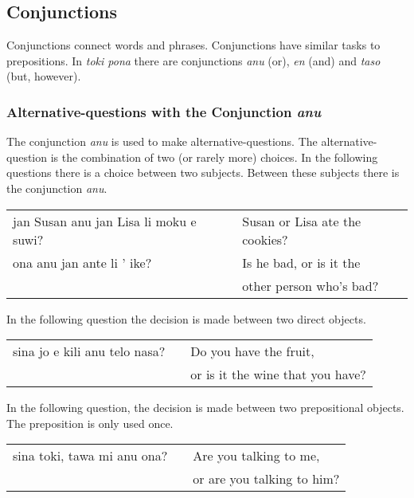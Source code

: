 \subsection*{Conjunctions}
%
%
Conjunctions connect words and phrases. 
Conjunctions have similar tasks to prepositions.
In \textit{toki pona} there are conjunctions \textit{anu} (or),  \textit{en} (and) and \textit{taso} (but, however).

%
\subsubsection*{Alternative-questions with the Conjunction \textit{anu}}
%
%
The conjunction \textit{anu} is used to make alternative-questions. 
The alternative-question is the combination of two (or rarely more) choices. 
In the following questions there is a choice between two subjects. 
Between these subjects there is the conjunction \textit{anu}. 

\begin{supertabular}{p{5,5cm}|ll}
jan Susan anu jan Lisa li moku e suwi?  && Susan or Lisa ate the cookies? \\
ona anu jan ante li ' ike? && Is he bad, or is it the \\ && other person who's bad? \\
\end{supertabular} 

In the following question the decision is made between two direct objects. 

\begin{supertabular}{p{5,5cm}|ll}
sina jo e kili anu telo nasa? && Do you have the fruit, \\ && or is it the wine that you have? \\
\end{supertabular} 

In the following question, the decision is made between two prepositional objects. 
The preposition is only used once. 

\begin{supertabular}{p{5,5cm}|ll}
sina toki, tawa mi anu ona? && Are you talking to me, \\ && or are you talking to him? \\
\end{supertabular} 

